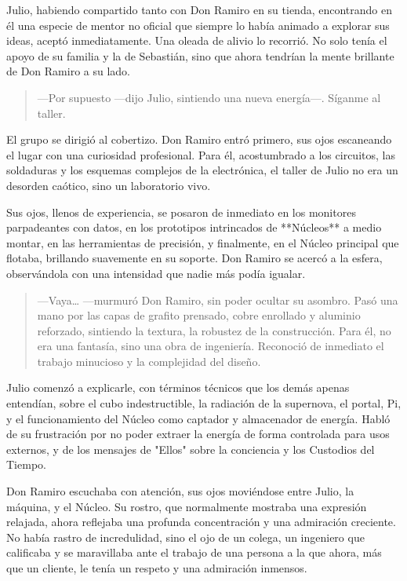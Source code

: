 \documentclass[a4paper,12pt]{book}
\begin{document}
Julio, habiendo compartido tanto con Don Ramiro en su tienda, encontrando en él una especie de mentor no oficial que siempre lo había animado a explorar sus ideas, aceptó inmediatamente. Una oleada de alivio lo recorrió. No solo tenía el apoyo de su familia y la de Sebastián, sino que ahora tendrían la mente brillante de Don Ramiro a su lado.

\begin{quote}
    —Por supuesto —dijo Julio, sintiendo una nueva energía—. Síganme al taller.
\end{quote}

El grupo se dirigió al cobertizo. Don Ramiro entró primero, sus ojos escaneando el lugar con una curiosidad profesional. Para él, acostumbrado a los circuitos, las soldaduras y los esquemas complejos de la electrónica, el taller de Julio no era un desorden caótico, sino un laboratorio vivo.

Sus ojos, llenos de experiencia, se posaron de inmediato en los monitores parpadeantes con datos, en los prototipos intrincados de **Núcleos** a medio montar, en las herramientas de precisión, y finalmente, en el Núcleo principal que flotaba, brillando suavemente en su soporte. Don Ramiro se acercó a la esfera, observándola con una intensidad que nadie más podía igualar.

\begin{quote}
    —Vaya… —murmuró Don Ramiro, sin poder ocultar su asombro. Pasó una mano por las capas de grafito prensado, cobre enrollado y aluminio reforzado, sintiendo la textura, la robustez de la construcción. Para él, no era una fantasía, sino una obra de ingeniería. Reconoció de inmediato el trabajo minucioso y la complejidad del diseño.
\end{quote}

Julio comenzó a explicarle, con términos técnicos que los demás apenas entendían, sobre el cubo indestructible, la radiación de la supernova, el portal, Pi, y el funcionamiento del Núcleo como captador y almacenador de energía. Habló de su frustración por no poder extraer la energía de forma controlada para usos externos, y de los mensajes de "Ellos" sobre la conciencia y los Custodios del Tiempo.

Don Ramiro escuchaba con atención, sus ojos moviéndose entre Julio, la máquina, y el Núcleo. Su rostro, que normalmente mostraba una expresión relajada, ahora reflejaba una profunda concentración y una admiración creciente. No había rastro de incredulidad, sino el ojo de un colega, un ingeniero que calificaba y se maravillaba ante el trabajo de una persona a la que ahora, más que un cliente, le tenía un respeto y una admiración inmensos.
\end{document}
